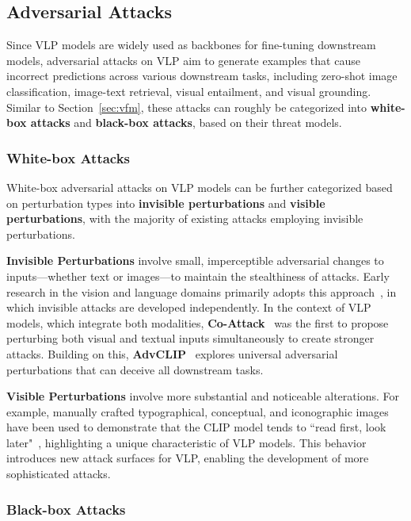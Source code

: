 \subsection{Adversarial Attacks}
\label{sec:vlp-attack}
Since VLP models are widely used as backbones for fine-tuning downstream models, adversarial attacks on VLP aim to generate examples that cause incorrect predictions across various downstream tasks, including zero-shot image classification, image-text retrieval, visual entailment, and visual grounding. Similar to Section~\ref{sec:vfm}, these attacks can roughly be categorized into \textbf{white-box attacks} and \textbf{black-box attacks}, based on their threat models.


\subsubsection{White-box Attacks}
White-box adversarial attacks on VLP models can be further categorized based on perturbation types into \textbf{invisible perturbations} and \textbf{visible perturbations}, with the majority of existing attacks employing invisible perturbations.



\textbf{Invisible Perturbations} involve small, imperceptible adversarial changes to inputs—whether text or images—to maintain the stealthiness of attacks. Early research in the vision and language domains primarily adopts this approach~\cite{xu2018fooling, shah2019cycle, li2020bert, yang2021defending}, in which invisible attacks are developed independently.
In the context of VLP models, which integrate both modalities, \textbf{Co-Attack}~\cite{zhang2022towards} was the first to propose perturbing both visual and textual inputs simultaneously to create stronger attacks. Building on this, \textbf{AdvCLIP}~\cite{zhou2023advclip} explores universal adversarial perturbations that can deceive all downstream tasks.

\textbf{Visible Perturbations} involve more substantial and noticeable alterations. For example, manually crafted typographical, conceptual, and iconographic images have been used to demonstrate that the CLIP model tends to ``read first, look later"~\cite{noever2021reading}, highlighting a unique characteristic of VLP models. This behavior introduces new attack surfaces for VLP, enabling the development of more sophisticated attacks.


\subsubsection{Black-box Attacks}

